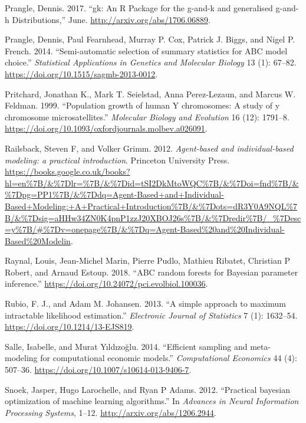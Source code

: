 \documentclass[]{article}
\begin{document}
\leavevmode\hypertarget{ref-Prangle2017}{}%
Prangle, Dennis. 2017. ``gk: An R Package for the g-and-k and generalised g-and-h Distributions,'' June. \url{http://arxiv.org/abs/1706.06889}.

\leavevmode\hypertarget{ref-Prangle2014}{}%
Prangle, Dennis, Paul Fearnhead, Murray P. Cox, Patrick J. Biggs, and Nigel P. French. 2014. ``Semi-automatic selection of summary statistics for ABC model choice.'' \emph{Statistical Applications in Genetics and Molecular Biology} 13 (1): 67--82. \url{https://doi.org/10.1515/sagmb-2013-0012}.

\leavevmode\hypertarget{ref-Pritchard1999}{}%
Pritchard, Jonathan K., Mark T. Seielstad, Anna Perez-Lezaun, and Marcus W. Feldman. 1999. ``Population growth of human Y chromosomes: A study of y chromosome microsatellites.'' \emph{Molecular Biology and Evolution} 16 (12): 1791--8. \url{https://doi.org/10.1093/oxfordjournals.molbev.a026091}.

\leavevmode\hypertarget{ref-Railsback2011}{}%
Railsback, Steven F, and Volker Grimm. 2012. \emph{Agent-based and individual-based modeling: a practical introduction}. Princeton University Press. \url{https://books.google.co.uk/books?hl=en\%7B/\&\%7Dlr=\%7B/\&\%7Did=tSI2DkMtoWQC\%7B/\&\%7Doi=fnd\%7B/\&\%7Dpg=PP1\%7B/\&\%7Ddq=Agent-Based+and+Individual-Based+Modeling:+A+Practical+Introduction\%7B/\&\%7Dots=dR3Y0A9NQL\%7B/\&\%7Dsig=aHHw34ZN0K4pnP1zzJ20XBOJ26s\%7B/\&\%7Dredir\%7B/_\%7Desc=y\%7B/\#\%7Dv=onepage\%7B/\&\%7Dq=Agent-Based\%20and\%20Individual-Based\%20Modelin}.

\leavevmode\hypertarget{ref-MarixnArxiv}{}%
Raynal, Louis, Jean-Michel Marin, Pierre Pudlo, Mathieu Ribatet, Christian P Robert, and Arnaud Estoup. 2018. ``ABC random forests for Bayesian parameter inference.'' \url{https://doi.org/10.24072/pci.evolbiol.100036}.

\leavevmode\hypertarget{ref-Rubio2013}{}%
Rubio, F. J., and Adam M. Johansen. 2013. ``A simple approach to maximum intractable likelihood estimation.'' \emph{Electronic Journal of Statistics} 7 (1): 1632--54. \url{https://doi.org/10.1214/13-EJS819}.

\leavevmode\hypertarget{ref-Salle2014}{}%
Salle, Isabelle, and Murat Yıldızoğlu. 2014. ``Efficient sampling and meta-modeling for computational economic models.'' \emph{Computational Economics} 44 (4): 507--36. \url{https://doi.org/10.1007/s10614-013-9406-7}.

\leavevmode\hypertarget{ref-Snoek2012}{}%
Snoek, Jasper, Hugo Larochelle, and Ryan P Adams. 2012. ``Practical bayesian optimization of machine learning algorithms.'' In \emph{Advances in Neural Information Processing Systems}, 1--12. \url{http://arxiv.org/abs/1206.2944}.
\end{document}

